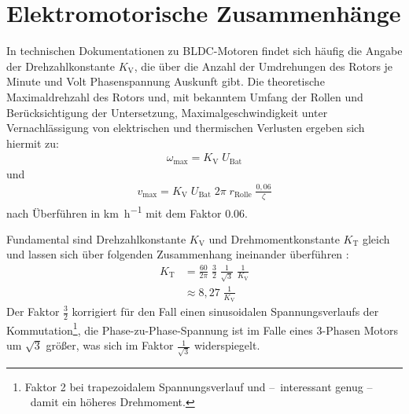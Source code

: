	\section{Elektromotorische Zusammenhänge}
		In technischen Dokumentationen zu BLDC-Motoren findet sich häufig die Angabe der Drehzahlkonstante \(K_\text{V}\), die über die Anzahl der Umdrehungen des Rotors je Minute und Volt Phasenspannung Auskunft gibt.
		Die theoretische Maximaldrehzahl des Rotors und, mit bekanntem Umfang der Rollen und Berücksichtigung der Untersetzung, Maximalgeschwindigkeit unter Vernachlässigung von elektrischen und thermischen Verlusten ergeben sich hiermit zu:
		\begin{align}
			\omega_\text{max} = K_\text{V} \; U_\text{Bat}
			\label{eq:max rpm}
		\end{align}
		und
		\begin{align}
			v_\text{max} = K_\text{V} \; U_\text{Bat} \; 2\pi \; r_\text{Rolle} \; \frac{0,06}{\zeta}
			\label{eq:max speed km h}
		\end{align}
		nach Überführen in \unit{\kilo\metre\per\hour} mit dem Faktor \num{0,06}.\par\medskip
		Fundamental sind Drehzahlkonstante \(K_\text{V}\) und Drehmomentkonstante \(K_\text{T}\) gleich und lassen sich über folgenden Zusammenhang ineinander überführen \cites{mevey2009sensorless}{DalY.Ohm.2000}{AN885.BLDC.fundamentals}:
		\begin{align}
			K_\text{T}	&= \frac{60}{2\pi} \; \frac{3}{2} \; \frac{1}{\sqrt{3}} \; \frac{1}{K_\text{V}} \nonumber \\
				&\approx 8,27 \; \frac{1}{K_\text{V}}
			\label{eq:kv to kt}
		\end{align}
		Der Faktor \(\frac{3}{2}\) korrigiert für den Fall einen sinusoidalen Spannungsverlaufs der Kommutation\footnote{\hspace{1mm}Faktor 2 bei trapezoidalem Spannungsverlauf und --~interessant genug --~damit ein höheres Drehmoment.}\cites{DalY.Ohm.2000}{mevey2009sensorless}, die Phase-zu-Phase-Spannung ist im Falle eines 3-Phasen Motors um \(\sqrt{3}\) größer, was sich im Faktor \(\frac{1}{\sqrt{3}}\) widerspiegelt.

